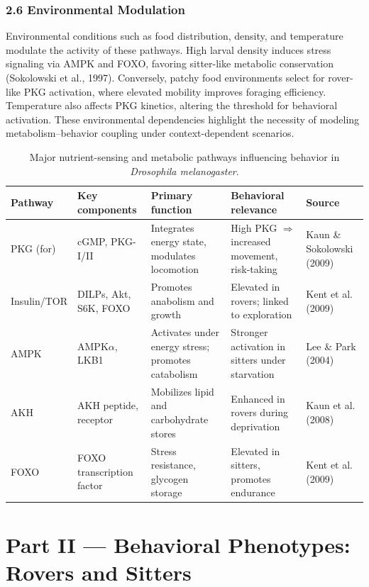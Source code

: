 \documentclass[11pt]{article}
\begin{document}
\subsubsection*{2.6 Environmental Modulation}

Environmental conditions such as food distribution, density, and temperature modulate the activity of these pathways. High larval density induces stress signaling via AMPK and FOXO, favoring sitter-like metabolic conservation (Sokolowski et al., 1997). Conversely, patchy food environments select for rover-like PKG activation, where elevated mobility improves foraging efficiency. Temperature also affects PKG kinetics, altering the threshold for behavioral activation. These environmental dependencies highlight the necessity of modeling metabolism--behavior coupling under context-dependent scenarios.

\begin{table}[ht]
  \centering
  \begin{tabular}{lllll}
    \toprule
    Pathway & Key components & Primary function & Behavioral relevance & Source \\
    \midrule
    PKG (for) & cGMP, PKG-I/II & Integrates energy state, modulates locomotion & High PKG $\Rightarrow$ increased movement, risk-taking & Kaun \& Sokolowski (2009) \\
    Insulin/TOR & DILPs, Akt, S6K, FOXO & Promotes anabolism and growth & Elevated in rovers; linked to exploration & Kent et al. (2009) \\
    AMPK & AMPK$\alpha$, LKB1 & Activates under energy stress; promotes catabolism & Stronger activation in sitters under starvation & Lee \& Park (2004) \\
    AKH & AKH peptide, receptor & Mobilizes lipid and carbohydrate stores & Enhanced in rovers during deprivation & Kaun et al. (2008) \\
    FOXO & FOXO transcription factor & Stress resistance, glycogen storage & Elevated in sitters, promotes endurance & Kent et al. (2009) \\
    \bottomrule
  \end{tabular}
  \caption{Major nutrient-sensing and metabolic pathways influencing behavior in \emph{Drosophila melanogaster}.}
\end{table}

\section*{Part II --- Behavioral Phenotypes: Rovers and Sitters}
\end{document}
